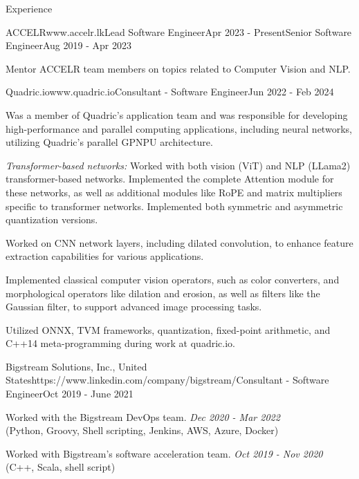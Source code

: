 \documentclass[
	11pt, %
]{./../assets/resume} %
\begin{document}
\begin{rSection}{Experience}
    \begin{rSubsectionM}{ACCELR}{www.accelr.lk}{Lead Software Engineer}{Apr 2023 - Present}{Senior Software Engineer}{Aug 2019 - Apr 2023}{}{}
        \item Mentor ACCELR team members on topics related to Computer Vision and NLP.
	\end{rSubsectionM}

    \begin{rSubsectionX}{Quadric.io}{www.quadric.io}{Consultant - Software Engineer}{Jun 2022 - Feb 2024}
        \item Was a member of Quadric's application team and was responsible for developing high-performance and parallel computing applications, including neural networks, utilizing Quadric's parallel GPNPU architecture.
        \item \textit{Transformer-based networks:} Worked with both vision (ViT) and NLP (LLama2) transformer-based networks. Implemented the complete Attention module for these networks, as well as additional modules like RoPE and matrix multipliers specific to transformer networks. Implemented both symmetric and asymmetric quantization versions.
        \item Worked on CNN network layers, including dilated convolution, to enhance feature extraction capabilities for various applications.
        \item Implemented classical computer vision operators, such as color converters, and morphological operators like dilation and erosion, as well as filters like the Gaussian filter, to support advanced image processing tasks.
        \item Utilized ONNX, TVM frameworks, quantization, fixed-point arithmetic, and C++14 meta-programming during work at quadric.io.
    \end{rSubsectionX}

    \begin{rSubsectionX}{Bigstream Solutions, Inc., United States}{https://www.linkedin.com/company/bigstream/}{Consultant - Software Engineer}{Oct 2019 - June 2021}
        \item Worked with the Bigstream DevOps team. \hfill {\textit{Dec 2020 - Mar 2022}} \\(Python, Groovy, Shell scripting, Jenkins, AWS, Azure, Docker)
        \item Worked with Bigstream's software acceleration team. \hfill {\textit{Oct 2019 - Nov 2020}} \\(C++, Scala, shell script)
    \end{rSubsectionX}


\end{rSection}
\end{document}

